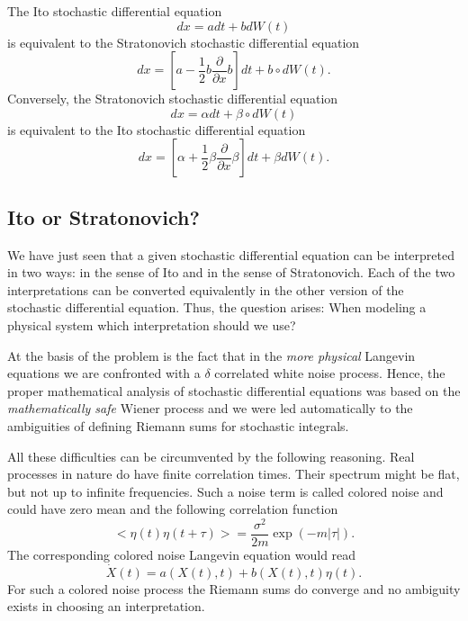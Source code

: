 The Ito stochastic differential equation
\begin{equation}
dx = a dt + b dW(t)
\end{equation}
is equivalent to the Stratonovich stochastic differential equation
\begin{equation}
dx = [a- \frac{1}{2} b \frac{\partial}{\partial x}b] dt + b \circ 
dW(t).
\end{equation}
Conversely, the Stratonovich stochastic differential equation
\begin{equation*}
dx = \alpha dt + \beta \circ dW(t)
\end{equation*}
is equivalent to the Ito stochastic differential equation
\begin{equation*}
dx = [\alpha + \frac{1}{2} \beta \frac{\partial}{\partial x} 
\beta]dt + \beta dW(t).
\end{equation*}

\subsection{Ito or Stratonovich?}
We have just seen that a given stochastic differential 
equation can be interpreted in two ways: in the sense of Ito and 
in the sense of Stratonovich. Each of the two interpretations can be converted
equivalently in the other version of the stochastic differential 
equation. Thus, the question arises: When modeling a physical 
system which interpretation should we use? 

At the basis of the problem is the fact that 
in the {\em more physical} Langevin equations we are confronted
with a $\delta$ correlated white noise process.
Hence, the proper 
mathematical analysis of stochastic differential equations was based 
on the {\em mathematically safe} Wiener process and we were led
automatically to the ambiguities of defining Riemann sums for 
stochastic integrals.

All these difficulties can be circumvented by the following 
reasoning. Real processes in nature do have finite correlation 
times. Their spectrum might be flat, but not up to infinite 
frequencies. Such a noise term is called colored  noise and could 
have zero mean and the following correlation function
\begin{equation*}
< \eta(t) \eta(t+\tau) > = \frac{\sigma^2}{2m} \exp(- m |\tau|).
\end{equation*}
The corresponding colored noise Langevin equation would read
\begin{equation}
\dot{X}(t) = a(X(t),t) + b(X(t),t) \eta(t).
\end{equation}
For such a colored noise process the Riemann sums do converge and 
no ambiguity exists in choosing an interpretation.

